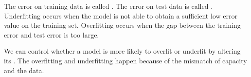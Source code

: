 The error on training data is called .
The error on test data is called .
Underfitting occurs when the model is not able to obtain a sufficient low error value on the training set.
Overfitting occurs when the gap between the training error and test error is too large.


We can control whether a model is more likely to overfit or underfit by altering its .
The overfitting and underfitting happen because of the mismatch of capacity and the data.


